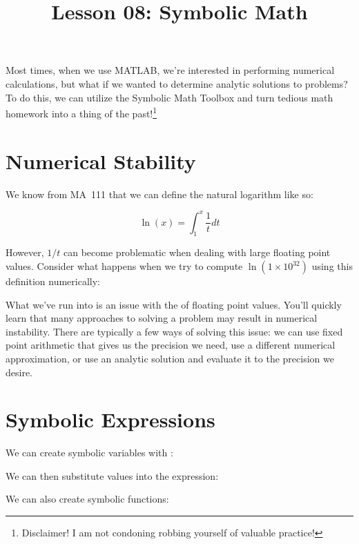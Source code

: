 \documentclass{article}
\title{Lesson 08: Symbolic Math}
\begin{document}
\renderTitle

Most times, when we use MATLAB, we're interested in performing numerical
calculations, but what if we wanted to determine analytic solutions to
problems?  To do this, we can utilize the Symbolic Math Toolbox%
 and turn
tedious math homework into a thing of the past!\footnote{Disclaimer!
I am not condoning robbing yourself of valuable practice!}

\section{Numerical Stability}

We know from MA~111 that we can define the natural logarithm like so:

\begin{equation}
	\ln(x)
	=
	\int^x_1
	\frac{1}{t}
	dt
\end{equation}

However, \(1 / t\) can become problematic when dealing with large
floating point values.  Consider what happens when we try to compute
\(\ln\left(1 \times 10^{32}\right)\) using this definition numerically:


What we've run into is an issue with the  of
floating point values.  You'll quickly learn that many approaches to
solving a problem may result in numerical instability.  There are
typically a few ways of solving this issue: we can use fixed point
arithmetic that gives us the precision we need, use a different
numerical approximation, or use an analytic solution and evaluate it to
the precision we desire.

\section{Symbolic Expressions}

We can create symbolic variables with
:


We can then substitute values into the expression:


We can also create symbolic functions:

\end{document}
